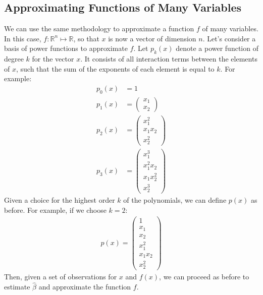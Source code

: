 \documentclass[12pt, a4paper]{article}
\begin{document}
\subsection{Approximating Functions of Many Variables}
\label{sec:org0cb6e4e}
We can use the same methodology to approximate a function \(f\) of many variables.
In this case, \(f:\mathbb{R}^n\mapsto\mathbb{R}\), so that \(x\) is now a vector of dimension \(n\).
Let's consider a basis of power functions to approximate \(f\).
Let \(p_k(x)\) denote a power function of degree \(k\) for the vector \(x\).
It consists of all interaction terms between the elements of \(x\), such that the sum of the exponents of each element is equal to \(k\).
For example:
\begin{align*}
p_0(x) &= 1\\
p_1(x) &= \begin{pmatrix}
x_1\\
x_2
\end{pmatrix}\\
p_2(x) &= \begin{pmatrix}
x_1^2\\
x_1x_2\\
x_2^2
\end{pmatrix}\\
p_3(x) &= \begin{pmatrix}
x_1^3\\
x_1^2x_2\\
x_1x_2^2\\
x_2^3
\end{pmatrix}
\end{align*}
Given a choice for the highest order \(k\) of the polynomials, we can define \(p(x)\) as before.
For example, if we choose \(k=2\):
\begin{align*}
  p(x)=\begin{pmatrix}
    1\\
    x_1\\
    x_2\\
    x_1^2\\
    x_1x_2\\
    x_2^2
  \end{pmatrix}
\end{align*}
Then, given a set of observations for \(x\) and \(f(x)\), we can proceed as before to estimate \(\hat{\beta}\) and approximate the function \(f\).
\end{document}
